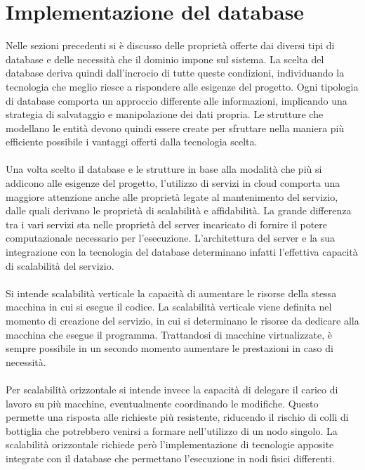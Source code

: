\section{Implementazione del database}
Nelle sezioni precedenti si è discusso delle proprietà
offerte dai diversi tipi di database e
delle necessità che il dominio impone sul sistema.
La scelta del database deriva quindi dall'incrocio di tutte queste condizioni,
individuando la tecnologia che meglio riesce a rispondere alle esigenze del progetto.
Ogni tipologia di database comporta un approccio differente alle informazioni,
implicando una strategia di salvataggio e manipolazione dei dati propria.
Le strutture che modellano le entità devono quindi
essere create per sfruttare nella maniera più efficiente possibile
i vantaggi offerti dalla tecnologia scelta.\\
\\
Una volta scelto il database e le strutture in base alla modalità
che più si addicono alle esigenze del progetto,
l'utilizzo di servizi in cloud comporta una maggiore attenzione anche
alle proprietà legate al mantenimento del servizio,
dalle quali derivano le proprietà di scalabilità e affidabilità.
La grande differenza tra i vari servizi sta nelle proprietà del server
incaricato di fornire il potere computazionale necessario per l'esecuzione.
L'architettura del server e la sua integrazione con la tecnologia del database
determinano infatti l'effettiva capacità di scalabilità del servizio.\\
\\
Si intende scalabilità verticale la capacità di aumentare le risorse
della stessa macchina in cui si esegue il codice.
La scalabilità verticale viene definita nel momento di creazione del servizio,
in cui si determinano le risorse da dedicare alla macchina che esegue il programma.
Trattandosi di macchine virtualizzate,
è sempre possibile in un secondo momento aumentare le prestazioni in caso di necessità.\\
\\
Per scalabilità orizzontale si intende invece la capacità di
delegare il carico di lavoro su più macchine, eventualmente coordinando le modifiche.
Questo permette una risposta alle richieste più resistente,
riducendo il rischio di colli di bottiglia che potrebbero venirsi a formare nell'utilizzo di un nodo singolo.
La scalabilità orizzontale richiede però l'implementazione
di tecnologie apposite integrate con il database che permettano l'esecuzione in nodi fisici differenti. \\
